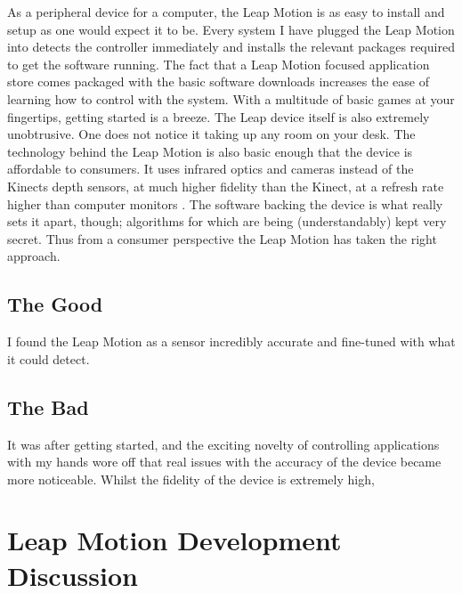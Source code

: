 \documentclass{sigplanconf}
\begin{document}
As a peripheral device for a computer, the Leap Motion is as easy to install and setup as one would expect it to be. Every system I have plugged the Leap Motion into detects the controller immediately and installs the relevant packages required to get the software running. The fact that a Leap Motion focused application store comes packaged with the basic software downloads increases the ease of learning how to control with the system. With a multitude of basic games at your fingertips, getting started is a breeze. The Leap device itself is also extremely unobtrusive. One does not notice it taking up any room on your desk. The technology behind the Leap Motion is also basic enough that the device is affordable to consumers. It uses infrared optics and cameras instead of the Kinects depth sensors, at much higher fidelity than the Kinect, at a refresh rate higher than computer monitors \cite{}. The software backing the device is what really sets it apart, though; algorithms for which are being (understandably) kept very secret. Thus from a consumer perspective the Leap Motion has taken the right approach. 



\subsection{The Good}

I found the Leap Motion as a sensor incredibly accurate and fine-tuned with what it could detect. 

\subsection{The Bad}

It was after getting started, and the exciting novelty of controlling applications with my hands wore off that real issues with the accuracy of the device became more noticeable. Whilst the fidelity of the device is extremely high, 




\section{Leap Motion Development Discussion}
\end{document}
